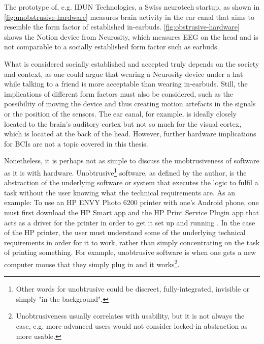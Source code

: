 The prototype of, e.g. IDUN Technologies, a Swiss neurotech startup, as shown in \autoref{fig:unobstrusive-hardware} measures brain activity in the ear canal that aims to resemble the form factor of established in-earbuds. \autoref{fig:obstrusive-hardware} shows the Notion device from Neurosity, which measures EEG on the head and is not comparable to a socially established form factor such as earbuds.

What is considered socially established and accepted truly depends on the society and context, as one could argue that wearing a Neurosity device under a hat while talking to a friend is more acceptable than wearing in-earbuds. Still, the implications of different form factors must also be considered, such as the possibility of moving the device and thus creating motion artefacts in the signals or the position of the sensors. The ear canal, for example, is ideally closely located to the brain's auditory cortex but not so much for the visual cortex, which is located at the back of the head. However, further hardware implications for BCIs are not a topic covered in this thesis.

Nonetheless, it is perhaps not as simple to discuss the unobtrusiveness of software as it is with hardware. Unobtrusive\footnote{Other words for unobtrusive could be discreet, fully-integrated, invisible or simply "in the background".} software, as defined by the author, is the abstraction of the underlying software or system that executes the logic to fulfil a task without the user knowing what the technical requirements are. As an example: To use an HP ENVY Photo 6200 printer with one's Android phone, one must first download the HP Smart app and the HP Print Service Plugin app that acts as a driver for the printer in order to get it set up and running \citep{hp_hp_nodate}. In the case of the HP printer, the user must understand some of the underlying technical requirements in order for it to work, rather than simply concentrating on the task of printing something. For example, unobtrusive software is when one gets a new computer mouse that they simply plug in and it works\footnote{Unobtrusiveness usually correlates with usability, but it is not always the case, e.g. more advanced users would not consider locked-in abstraction as more usable.}.

